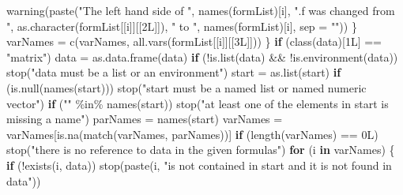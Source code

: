 \documentclass[a4paper, twoside]{templates/ociamthesis}
\newenvironment{Shaded}{\begin{snugshade}}{\end{snugshade}}
\newcommand{\AttributeTok}[1]{\textcolor[rgb]{0.77,0.63,0.00}{#1}}
\newcommand{\ControlFlowTok}[1]{\textcolor[rgb]{0.13,0.29,0.53}{\textbf{#1}}}
\newcommand{\FunctionTok}[1]{\textcolor[rgb]{0.00,0.00,0.00}{#1}}
\newcommand{\NormalTok}[1]{#1}
\newcommand{\OtherTok}[1]{\textcolor[rgb]{0.56,0.35,0.01}{#1}}
\newcommand{\SpecialCharTok}[1]{\textcolor[rgb]{0.00,0.00,0.00}{#1}}
\newcommand{\StringTok}[1]{\textcolor[rgb]{0.31,0.60,0.02}{#1}}
\renewenvironment{Shaded}
{
  \vspace{10pt}%
  \begin{snugshade}%
}{%
  \end{snugshade}%
  \vspace{8pt}%
}
\begin{document}
\begin{Shaded}
\begin{Highlighting}[]
      \FunctionTok{warning}\NormalTok{(}\FunctionTok{paste}\NormalTok{(}\StringTok{"The left hand side of "}\NormalTok{, }\FunctionTok{names}\NormalTok{(formList)[i], }
                    \StringTok{".f was changed from "}\NormalTok{, }\FunctionTok{as.character}\NormalTok{(formList[[i]][[2L]]), }
                    \StringTok{" to "}\NormalTok{, }\FunctionTok{names}\NormalTok{(formList)[i], }\AttributeTok{sep =} \StringTok{""}\NormalTok{))}
\NormalTok{    \}}
\NormalTok{    varNames }\OtherTok{=} \FunctionTok{c}\NormalTok{(varNames, }\FunctionTok{all.vars}\NormalTok{(formList[[i]][[3L]]))}
\NormalTok{  \}}
  \ControlFlowTok{if}\NormalTok{ (}\FunctionTok{class}\NormalTok{(data)[1L] }\SpecialCharTok{==} \StringTok{"matrix"}\NormalTok{) }
\NormalTok{    data }\OtherTok{=} \FunctionTok{as.data.frame}\NormalTok{(data)}
  \ControlFlowTok{if}\NormalTok{ (}\SpecialCharTok{!}\FunctionTok{is.list}\NormalTok{(data) }\SpecialCharTok{\&\&} \SpecialCharTok{!}\FunctionTok{is.environment}\NormalTok{(data)) }
    \FunctionTok{stop}\NormalTok{(}\StringTok{"\textquotesingle{}data\textquotesingle{} must be a list or an environment"}\NormalTok{)}
\NormalTok{  start }\OtherTok{=} \FunctionTok{as.list}\NormalTok{(start)}
  \ControlFlowTok{if}\NormalTok{ (}\FunctionTok{is.null}\NormalTok{(}\FunctionTok{names}\NormalTok{(start))) }
    \FunctionTok{stop}\NormalTok{(}\StringTok{"\textquotesingle{}start\textquotesingle{} must be a named list or named numeric vector"}\NormalTok{)}
  \ControlFlowTok{if}\NormalTok{ (}\StringTok{""} \SpecialCharTok{\%in\%} \FunctionTok{names}\NormalTok{(start)) }
    \FunctionTok{stop}\NormalTok{(}\StringTok{"at least one of the elements in \textquotesingle{}start\textquotesingle{} is missing a name"}\NormalTok{)}
\NormalTok{  parNames }\OtherTok{=} \FunctionTok{names}\NormalTok{(start)}
\NormalTok{  varNames }\OtherTok{=}\NormalTok{ varNames[}\FunctionTok{is.na}\NormalTok{(}\FunctionTok{match}\NormalTok{(varNames, parNames))]}
  \ControlFlowTok{if}\NormalTok{ (}\FunctionTok{length}\NormalTok{(varNames) }\SpecialCharTok{==}\NormalTok{ 0L) }
    \FunctionTok{stop}\NormalTok{(}\StringTok{"there is no reference to data in the given formulas"}\NormalTok{)}
  \ControlFlowTok{for}\NormalTok{ (i }\ControlFlowTok{in}\NormalTok{ varNames) \{}
    \ControlFlowTok{if}\NormalTok{ (}\SpecialCharTok{!}\FunctionTok{exists}\NormalTok{(i, data)) }
      \FunctionTok{stop}\NormalTok{(}\FunctionTok{paste}\NormalTok{(i, }\StringTok{"is not contained in \textquotesingle{}start\textquotesingle{} and it is not found in \textquotesingle{}data\textquotesingle{}"}\NormalTok{))}

\end{Highlighting}
\end{Shaded}
\end{document}
